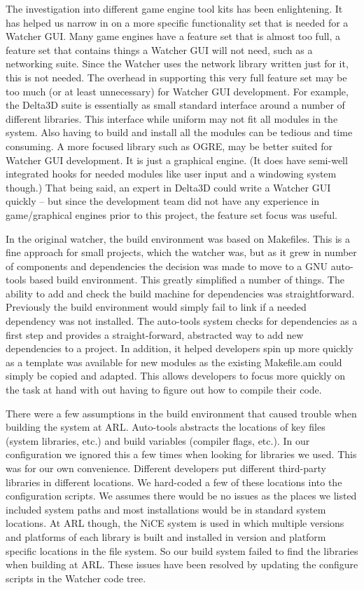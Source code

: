 \documentclass{report}
\begin{document}
The investigation into different game engine tool kits has been enlightening. It has helped us narrow in on a more specific functionality set that is needed
for a Watcher GUI. Many game engines have a feature set that is almost too full, a feature set that contains things a Watcher GUI will not need, such as 
a networking suite. Since the Watcher uses the network library written just for it, this is not needed. The overhead in supporting this very full
feature set may be too much (or at least unnecessary) for Watcher GUI development. For example, the Delta3D suite is essentially as small standard 
interface around a number of different libraries. This interface while uniform may not fit all modules in the system. Also having to build and install
all the modules can be tedious and time consuming. A more focused library such as OGRE, may be better suited for Watcher GUI development. It is just 
a graphical engine. (It does have semi-well integrated hooks for needed modules like user input and a windowing system though.) That being said, an expert 
in Delta3D could write a Watcher GUI quickly -- but since the development team did not have any experience in game\slash graphical engines prior to 
this project, the feature set focus was useful. 

In the original watcher, the build environment was based on Makefiles. This is a fine approach for small projects, which the watcher was, but as it grew
in number of components and dependencies the decision was made to move to a GNU auto-tools based build environment. This greatly simplified a number
of things. The ability to add and check the build machine for dependencies was straightforward. Previously the build environment would simply fail to link
if a needed dependency was not installed. The auto-tools system checks for dependencies as a first step and provides a straight-forward, abstracted way 
to add new dependencies to a project. In addition, it helped developers spin up more quickly as a template was available for new modules as the existing
Makefile.am could simply be copied and adapted. This allows developers to focus more quickly on the task at hand with out having to figure out how to 
compile their code. 

There were a few assumptions in the build environment that caused trouble when building the system at ARL. Auto-tools abstracts the locations
of key files (system libraries, etc.) and build variables (compiler flags, etc.). In our configuration we ignored this a few times when looking 
for libraries we used. This was for our own convenience. Different developers put different third-party libraries in different locations. We hard-coded
a few of these locations into the configuration scripts. We assumes there would be no issues as the places we listed included system paths and most
installations would be in standard system locations. At ARL though, the NiCE system is used in which multiple versions and platforms of each library
is built and installed in version and platform specific locations in the file system. So our build system failed to find the libraries when building 
at ARL. These issues have been resolved by updating the configure scripts in the Watcher code tree. 
\end{document}
